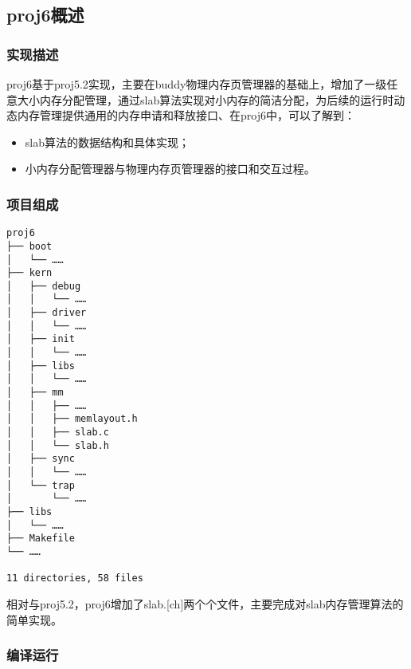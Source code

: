 \subsection{proj6概述}\label{proj6ux6982ux8ff0}

\subsubsection{实现描述}\label{ux5b9eux73b0ux63cfux8ff0}

proj6基于proj5.2实现，主要在buddy物理内存页管理器的基础上，增加了一级任意大小内存分配管理，通过slab算法实现对小内存的简洁分配，为后续的运行时动态内存管理提供通用的内存申请和释放接口、在proj6中，可以了解到：

\begin{itemize}
\tightlist
\item
  slab算法的数据结构和具体实现；
\item
  小内存分配管理器与物理内存页管理器的接口和交互过程。
\end{itemize}

\subsubsection{项目组成}\label{ux9879ux76eeux7ec4ux6210}

\begin{lstlisting}
proj6
├── boot
│   └── ……
├── kern
│   ├── debug
│   │   └── ……
│   ├── driver
│   │   └── ……
│   ├── init
│   │   └── ……
│   ├── libs
│   │   └── ……
│   ├── mm
│   │   ├── ……
│   │   ├── memlayout.h
│   │   ├── slab.c
│   │   └── slab.h
│   ├── sync
│   │   └── ……
│   └── trap
│       └── ……
├── libs
│   └── ……
├── Makefile
└── ……

11 directories, 58 files
\end{lstlisting}

相对与proj5.2，proj6增加了slab.{[}ch{]}两个个文件，主要完成对slab内存管理算法的简单实现。

\subsubsection{编译运行}\label{ux7f16ux8bd1ux8fd0ux884c}

